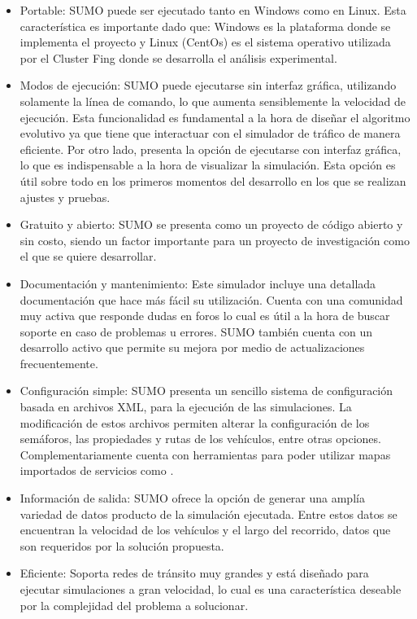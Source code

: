 \begin{itemize}
	\item Portable: SUMO puede ser ejecutado tanto en Windows como en Linux. Esta característica es importante dado que: Windows es la plataforma donde se implementa el proyecto y Linux (CentOs) es el sistema operativo utilizada por el Cluster Fing  donde se desarrolla el análisis experimental.
	
	\item Modos de ejecución: SUMO puede ejecutarse sin interfaz gráfica, utilizando solamente la línea de comando, lo que aumenta sensiblemente la velocidad de ejecución. Esta funcionalidad es fundamental a la hora de diseñar el algoritmo evolutivo ya que tiene que interactuar con el simulador de tráfico de manera eficiente. Por otro lado, presenta la opción de ejecutarse con interfaz gráfica, lo que es indispensable a la hora de visualizar la simulación. Esta opción es útil sobre todo en los primeros momentos del desarrollo en los que se realizan ajustes y pruebas.
	
	\item Gratuito y abierto: SUMO se presenta como un proyecto de código abierto y sin costo, siendo un factor importante para un proyecto de investigación como el que se quiere desarrollar. 
	
	\item Documentación y mantenimiento: Este simulador incluye una detallada documentación que hace más fácil su utilización. Cuenta con una comunidad muy activa que responde dudas en foros lo cual es útil a la hora de buscar soporte en caso de problemas u errores. SUMO también cuenta con un desarrollo activo que permite su mejora por medio de actualizaciones frecuentemente.
	
	\item Configuración simple: SUMO presenta un sencillo sistema de configuración basada en archivos XML, para la ejecución de las simulaciones. La modificación de estos archivos permiten alterar la configuración de los semáforos, las propiedades y rutas de los vehículos, entre otras opciones. Complementariamente cuenta con herramientas para poder utilizar mapas importados de servicios como \citet{OSM}.
	
	\item Información de salida: SUMO ofrece la opción de generar una amplía variedad de datos producto de la simulación ejecutada. Entre estos datos se encuentran la velocidad de los vehículos y el largo del recorrido, datos que son requeridos por la solución propuesta.
	
	\item Eficiente: Soporta redes de tránsito muy grandes y está diseñado para ejecutar simulaciones a gran velocidad, lo cual es una característica deseable por la complejidad del problema a solucionar.
	
\end{itemize}


